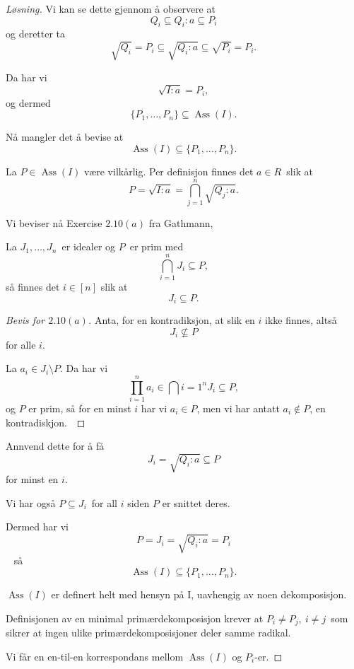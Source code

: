 \documentclass[11pt]{article}
\DeclareMathOperator{\Ass}{\operatorname{Ass}}
\begin{document}
\begin{proof}[L{\o}sning]
    Vi kan se dette 
    gjennom {\aa} observere at 
    \[
        Q_i \subseteq Q_i : a \subseteq P_i
    \]
    og deretter ta 
    \[
        \sqrt{Q_i} = P_i \subseteq \sqrt{Q_i : a} 
        \subseteq \sqrt{P_i} = P_i. 
    \]

    Da har vi 
    \[
        \sqrt{I:a} = P_i, 
    \]
    og dermed 
    \[
        \{P_1,\ldots,P_n\} \subseteq \Ass(I).
    \]

    N{\aa} mangler det {\aa} bevise at 
    \[
        \Ass(I) \subseteq \{P_1,\ldots,P_n\}. 
    \]

    La $P \in \Ass(I)$ v{\ae}re vilk{\aa}rlig. 
    Per definisjon finnes det $a \in R$ slik at 
    \[
        P = \sqrt{I:a} = \bigcap_{j=1}^n \sqrt{Q_j : a}.
    \]

    Vi beviser n{\aa}  
    Exercise $2.10(a)$ fra Gathmann, 
    \begin{prob*}
        La $J_1,\ldots,J_n$ er idealer og 
        $P$ er prim med 
        \[
            \bigcap_{i=1}^n J_i \subseteq P, 
        \]
        s{\aa} finnes det $i \in [n]$ slik at 
        \[
            J_i \subseteq P. 
        \]
    \end{prob*}
    \begin{proof}[Bevis for $2.10(a)$]
        Anta, for en kontradiksjon, at slik en 
        $i$ ikke finnes, alts{\aa} 
        \[
            J_i \not\subseteq P 
        \]
        for alle $i$. 

        La $a_i \in J_i\setminus P$. 
        Da har vi 
        \[
            \prod_{i=1}^n a_i \in 
            \bigcap{i=1}^n J_i \subseteq P,  
        \]
        og $P$ er prim, s{\aa} 
        for en minst $i$ har vi 
        $a_i \in P$, men vi har antatt 
        $a_i \not\in P$, en kontradiskjon. 
    \end{proof}

    Annvend dette for {\aa} f{\aa} 
    \[
        J_i = \sqrt{Q_i : a} \subseteq P 
    \]
    for minst en $i$. 

    Vi har ogs{\aa} $P \subseteq J_i$ for all 
    $i$ siden $P$ er snittet deres. 

    Dermed har vi 
    \[
        P = J_i = \sqrt{Q_i : a} = P_i 
    \] 
    s{\aa} 
    \[
        \Ass(I) \subseteq \{P_1,\ldots,P_n\}. 
    \]

    $\Ass(I)$ er definert helt med hensyn 
    p{\aa} I, uavhengig av noen dekomposisjon. 

    Definisjonen av en minimal prim{\ae}rdekomposisjon 
    krever at $P_i \neq P_j, \ i \neq j$ som 
    sikrer at ingen ulike prim{\ae}rdekomposisjoner 
    deler samme radikal. 

    Vi f{\aa}r en en-til-en korrespondans mellom 
    $\Ass(I)$ og $P_i$-er. 

\end{proof}
\end{document}
